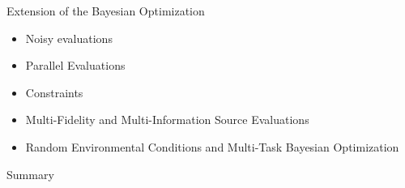 \documentclass{beamer}
\begin{document}
\begin{frame}{Extension of the Bayesian Optimization}
\begin{itemize}
\item Noisy evaluations
\item Parallel Evaluations
\item Constraints
\item Multi-Fidelity and Multi-Information Source Evaluations
\item Random Environmental Conditions and Multi-Task Bayesian Optimization
\end{itemize}
\end{frame}


\begin{frame}{Summary}


\end{frame}


\end{document}
